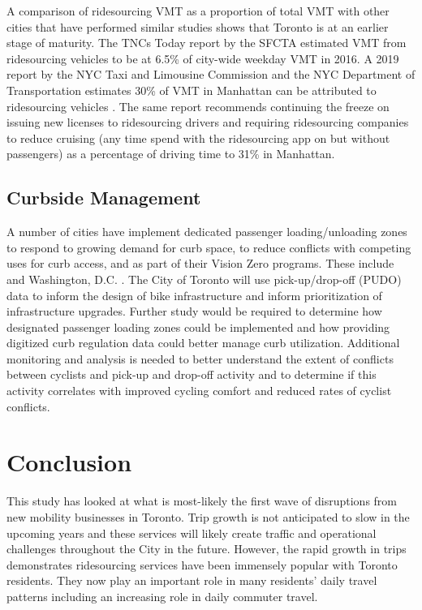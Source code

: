 \documentclass[]{trbunofficial_bdit_final}
\begin{document}
A comparison of ridesourcing VMT as a proportion of total VMT with other cities
that have performed similar studies shows that Toronto is at an earlier stage
of maturity. The TNCs Today report by the SFCTA estimated VMT from ridesourcing
vehicles to be at 6.5\% of city-wide weekday VMT \cite{tncstoday} in 2016. A
2019 report by the NYC Taxi and Limousine Commission and the NYC Department of
Transportation estimates 30\% of VMT in Manhattan can be attributed to
ridesourcing vehicles \cite{nyctlc2019report}. The same report recommends
continuing the freeze on issuing new licenses to ridesourcing drivers and
requiring ridesourcing companies to reduce cruising (any time spend with the
ridesourcing app on but without passengers) as a percentage of driving time to
31\% in Manhattan.

\hypertarget{sec:curbside-management}{%
\subsection{Curbside Management}\label{sec:curbside-management}}

A number of cities have implement dedicated passenger loading/unloading zones
to respond to growing demand for curb space, to reduce conflicts with competing
uses for curb access, and as part of their Vision Zero programs. These include
 and Washington, D.C. \cite{ddotcurb}. The City of
Toronto will use pick-up/drop-off (PUDO) data to inform the design of bike
infrastructure and inform prioritization of infrastructure upgrades. Further
study would be required to determine how designated passenger loading zones
could be implemented and how providing digitized curb regulation data could
better manage curb utilization. Additional monitoring and analysis is needed to
better understand the extent of conflicts between cyclists and pick-up and
drop-off activity and to determine if this activity correlates with improved
cycling comfort and reduced rates of cyclist conflicts.

\hypertarget{sec:conclusion}{%
\section{Conclusion}\label{sec:conclusion}}

This study has looked at what is most-likely the first wave of disruptions from
new mobility businesses in Toronto. Trip growth is not anticipated to slow in
the upcoming years and these services will likely create traffic and
operational challenges throughout the City in the future. However, the rapid
growth in trips demonstrates ridesourcing services have been immensely popular
with Toronto residents. They now play an important role in many residents'
daily travel patterns including an increasing role in daily commuter travel.
\end{document}
